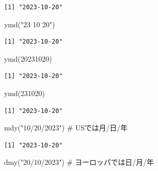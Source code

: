 \documentclass[
  letterpaper,
  DIV=11,
  numbers=noendperiod]{scrreprt}
\newenvironment{Shaded}{\begin{snugshade}}{\end{snugshade}}
\newcommand{\CommentTok}[1]{\textcolor[rgb]{0.37,0.37,0.37}{#1}}
\newcommand{\DecValTok}[1]{\textcolor[rgb]{0.68,0.00,0.00}{#1}}
\newcommand{\FunctionTok}[1]{\textcolor[rgb]{0.28,0.35,0.67}{#1}}
\newcommand{\NormalTok}[1]{\textcolor[rgb]{0.00,0.23,0.31}{#1}}
\newcommand{\StringTok}[1]{\textcolor[rgb]{0.13,0.47,0.30}{#1}}
\begin{document}
\begin{verbatim}
[1] "2023-10-20"
\end{verbatim}

\begin{Shaded}
\begin{Highlighting}[]
\FunctionTok{ymd}\NormalTok{(}\StringTok{"23 10 20"}\NormalTok{)}
\end{Highlighting}
\end{Shaded}

\begin{verbatim}
[1] "2023-10-20"
\end{verbatim}

\begin{Shaded}
\begin{Highlighting}[]
\FunctionTok{ymd}\NormalTok{(}\DecValTok{20231020}\NormalTok{)}
\end{Highlighting}
\end{Shaded}

\begin{verbatim}
[1] "2023-10-20"
\end{verbatim}

\begin{Shaded}
\begin{Highlighting}[]
\FunctionTok{ymd}\NormalTok{(}\DecValTok{231020}\NormalTok{)}
\end{Highlighting}
\end{Shaded}

\begin{verbatim}
[1] "2023-10-20"
\end{verbatim}

\begin{Shaded}
\begin{Highlighting}[]
\FunctionTok{mdy}\NormalTok{(}\StringTok{"10/20/2023"}\NormalTok{) }\CommentTok{\# USでは月/日/年}
\end{Highlighting}
\end{Shaded}

\begin{verbatim}
[1] "2023-10-20"
\end{verbatim}

\begin{Shaded}
\begin{Highlighting}[]
\FunctionTok{dmy}\NormalTok{(}\StringTok{"20/10/2023"}\NormalTok{) }\CommentTok{\# ヨーロッパでは日/月/年}
\end{Highlighting}
\end{Shaded}
\end{document}
